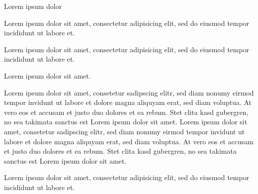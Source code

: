 \documentclass{article}
\begin{document}
{}


\begin{clozebox}[width = 1cm,rule=0.2cm]
Lorem ipsum dolor
\end{clozebox}


\clozehide

\begin{clozebox}
Lorem ipsum dolor sit amet, consectetur adipisicing elit, sed do eiusmod
tempor incididunt ut labore et.
\end{clozebox}


\clozeshow

\begin{clozebox}
Lorem ipsum dolor sit amet, consectetur adipisicing elit, sed do eiusmod
tempor incididunt ut labore et.
\end{clozebox}


\begin{clozebox}
Lorem ipsum dolor sit amet.
\end{clozebox}


\begin{clozebox}
Lorem ipsum dolor sit amet, consetetur sadipscing elitr, sed diam nonumy
eirmod tempor invidunt ut labore et dolore magna aliquyam erat, sed diam
voluptua. At vero eos et accusam et justo duo dolores et ea rebum. Stet
clita kasd gubergren, no sea takimata sanctus est Lorem ipsum dolor sit
amet. Lorem ipsum dolor sit amet, consetetur sadipscing elitr, sed diam
nonumy eirmod tempor invidunt ut labore et dolore magna aliquyam erat,
sed diam voluptua. At vero eos et accusam et justo duo dolores et ea
rebum. Stet clita kasd gubergren, no sea takimata sanctus est Lorem
ipsum dolor sit amet.
\end{clozebox}



\begin{clozebox}
Lorem ipsum dolor sit amet, consectetur adipisicing elit, sed do eiusmod
tempor incididunt ut labore et.
\end{clozebox}

\end{document}
